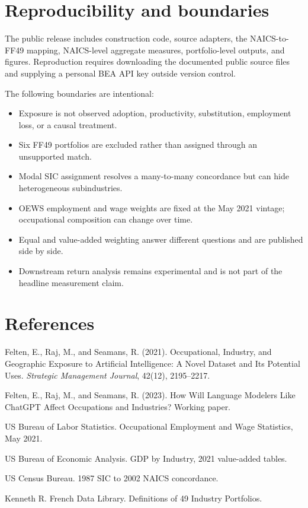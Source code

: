 \documentclass[11pt,a4paper]{article}
\begin{document}
\section{Reproducibility and boundaries}

The public release includes construction code, source adapters, the NAICS-to-FF49 mapping, NAICS-level aggregate measures, portfolio-level outputs, and figures. Reproduction requires downloading the documented public source files and supplying a personal BEA API key outside version control.

The following boundaries are intentional:

\begin{itemize}
  \item Exposure is not observed adoption, productivity, substitution, employment loss, or a causal treatment.
  \item Six FF49 portfolios are excluded rather than assigned through an unsupported match.
  \item Modal SIC assignment resolves a many-to-many concordance but can hide heterogeneous subindustries.
  \item OEWS employment and wage weights are fixed at the May 2021 vintage; occupational composition can change over time.
  \item Equal and value-added weighting answer different questions and are published side by side.
  \item Downstream return analysis remains experimental and is not part of the headline measurement claim.
\end{itemize}

\section*{References}

Felten, E., Raj, M., and Seamans, R. (2021). Occupational, Industry, and Geographic Exposure to Artificial Intelligence: A Novel Dataset and Its Potential Uses. \emph{Strategic Management Journal}, 42(12), 2195--2217.

Felten, E., Raj, M., and Seamans, R. (2023). How Will Language Modelers Like ChatGPT Affect Occupations and Industries? Working paper.

US Bureau of Labor Statistics. Occupational Employment and Wage Statistics, May 2021.

US Bureau of Economic Analysis. GDP by Industry, 2021 value-added tables.

US Census Bureau. 1987 SIC to 2002 NAICS concordance.

Kenneth R. French Data Library. Definitions of 49 Industry Portfolios.
\end{document}
